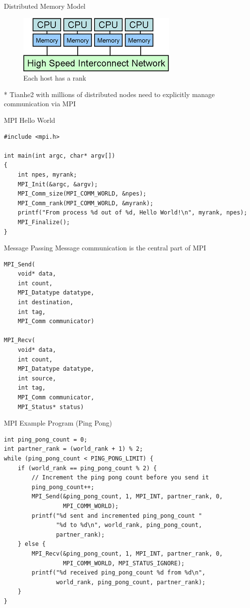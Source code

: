 \documentclass{../TexTemplate/myslide}
\begin{document}
\begin{frame}{Distributed Memory Model}
\begin{figure}
\centering
\includegraphics[width=0.5\linewidth]{fig/distributed_memory_model.png}
\caption*{Each host has a rank}
\end{figure}
* Tianhe2 with millions of distributed nodes need to explicitly manage communication via MPI
\end{frame}

\begin{frame}[fragile]{MPI Hello World}
\begin{lstlisting}
#include <mpi.h>

int main(int argc, char* argv[])
{
    int npes, myrank;
    MPI_Init(&argc, &argv);
    MPI_Comm_size(MPI_COMM_WORLD, &npes);
    MPI_Comm_rank(MPI_COMM_WORLD, &myrank);
    printf("From process %d out of %d, Hello World!\n", myrank, npes);
    MPI_Finalize();
}
\end{lstlisting}
\end{frame}

\begin{frame}[fragile]{Message Passing}
Message communication is the central part of MPI
\begin{lstlisting}[basicstyle=\scriptsize]
MPI_Send(
    void* data,
    int count,
    MPI_Datatype datatype,
    int destination,
    int tag,
    MPI_Comm communicator)

MPI_Recv(
    void* data,
    int count,
    MPI_Datatype datatype,
    int source,
    int tag,
    MPI_Comm communicator,
    MPI_Status* status)
\end{lstlisting}
\end{frame}

\begin{frame}[fragile]{MPI Example Program (Ping Pong)}
\begin{lstlisting}
int ping_pong_count = 0;
int partner_rank = (world_rank + 1) % 2;
while (ping_pong_count < PING_PONG_LIMIT) {
    if (world_rank == ping_pong_count % 2) {
        // Increment the ping pong count before you send it
        ping_pong_count++;
        MPI_Send(&ping_pong_count, 1, MPI_INT, partner_rank, 0,
                 MPI_COMM_WORLD);
        printf("%d sent and incremented ping_pong_count "
               "%d to %d\n", world_rank, ping_pong_count,
               partner_rank);
    } else {
        MPI_Recv(&ping_pong_count, 1, MPI_INT, partner_rank, 0,
                 MPI_COMM_WORLD, MPI_STATUS_IGNORE);
        printf("%d received ping_pong_count %d from %d\n",
               world_rank, ping_pong_count, partner_rank);
    }
}
\end{lstlisting}
\end{frame}
\end{document}
